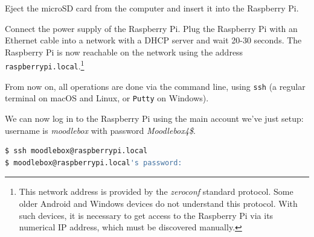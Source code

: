 \documentclass[12pt]{article}
\begin{document}
Eject the microSD card from the computer and insert it into the Raspberry Pi.

Connect the power supply of the Raspberry Pi.
Plug the Raspberry Pi with an Ethernet cable into a network with a DHCP server and wait 20-30 seconds.
The Raspberry Pi is now reachable on the network using the address \lstinline{raspberrypi.local}.\footnote{This network address is provided by the \emph{zeroconf} standard protocol.
Some older Android and Windows devices do not understand this protocol.
With such devices, it is necessary to get access to the Raspberry Pi via its numerical IP address, which must be discovered manually.}

From now on, all operations are done via the command line, using \lstinline{ssh} (a regular terminal on macOS and Linux, or \lstinline{Putty} on Windows).

We can now log in to the Raspberry Pi using the main account we've just setup: username is \emph{moodlebox} with password \emph{Moodlebox4\$}.

\begin{lstlisting}[language=bash]
$ ssh moodlebox@raspberrypi.local
$ moodlebox@raspberrypi.local's password:
\end{lstlisting}
\end{document}
